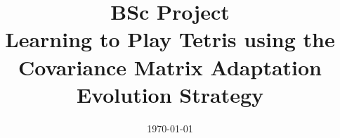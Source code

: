 



\title{BSc Project\\\textbf{Learning to Play Tetris using
    the Covariance Matrix Adaptation
    Evolution Strategy}}
\date{\today}
\maketitle

\tableofcontents

 \clearpage

















